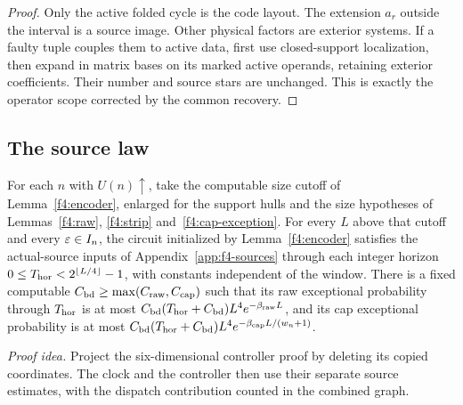 \begin{proof}
Only the active folded cycle is the code layout. The extension
\(a_r\) outside the interval is a source image. Other physical
factors are exterior systems. If a faulty tuple couples them to active
data, first use closed-support localization, then expand in matrix
bases on its marked active operands, retaining exterior coefficients.
Their number and source stars are unchanged. This is exactly the
operator scope corrected by the common recovery.
\end{proof}

\subsection{The source law}\label{f4:actual-sources}
\begin{lemma}\label{f4:sources}
For each \(n\) with \(U(n)\uparrow\), take the computable size cutoff
of Lemma~\ref{f4:encoder}, enlarged for the support hulls and the
size hypotheses of Lemmas~\ref{f4:raw}, \ref{f4:strip} and~\ref{f4:cap-exception}.
For every \(L\) above that cutoff and every \(\varepsilon\in I_n\), the
circuit initialized by Lemma~\ref{f4:encoder} satisfies the
actual-source inputs of Appendix~\ref{app:f4-sources} through each
integer horizon \(0\le T_{\rm hor}<2^{\lfloor L/4\rfloor}-1\), with
constants independent of the window. There is a fixed computable
\(C_{\rm bd}\ge\max(C_{\rm raw},C_{\rm cap})\) such that its raw
exceptional probability through \(T_{\rm hor}\) is at most
\(C_{\rm bd}(T_{\rm hor}+C_{\rm bd})L^4e^{-\beta_{\rm raw}L}\), and its cap exceptional probability
is at most \(C_{\rm bd}(T_{\rm hor}+C_{\rm bd})L^4e^{-\beta_{\rm cap} L/(w_n+1)}\).
\end{lemma}
\par\noindent\emph{Proof idea.} Project the six-dimensional controller proof by deleting its copied coordinates. The clock and the controller then use their separate source estimates, with the dispatch contribution counted in the combined graph.

